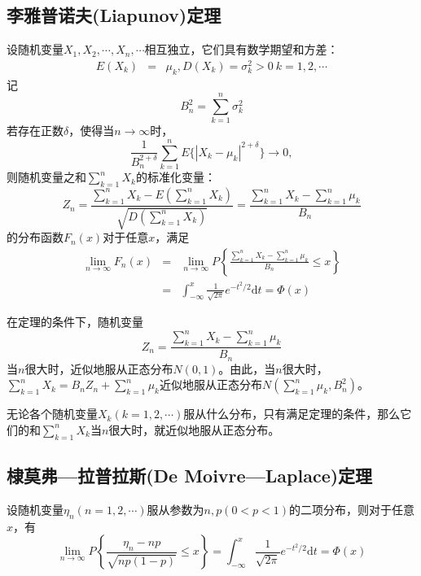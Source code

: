 \documentclass[12pt,a4paper]{article}
\newcommand{\dif}{\mathrm{d}}
\begin{document}
\subsection{李雅普诺夫(Liapunov)定理}
设随机变量$X_1, X_2, \cdots, X_n, \cdots$相互独立，它们具有数学期望和方差：
\begin{eqnarray}
\nonumber E(X_k) &=& \mu_k, D(X_k) = \sigma_k^2 > 0 ~k = 1, 2, \cdots
\end{eqnarray}
记
\begin{equation}
\nonumber B_n^2 = \sum_{k=1}^n \sigma_k^2 
\end{equation}
若存在正数$\delta$，使得当$n\rightarrow\infty$时，
\begin{equation}
\frac{1}{B_n^{2+\delta}} \sum_{k=1}^n E\{|X_k -\mu_k|^{2+\delta}  \} \rightarrow 0,
\end{equation}
则随机变量之和$\sum\limits_{k=1}^n X_k$的标准化变量：
\begin{equation}
Z_n = \frac{\sum\limits_{k=1}^n X_k -E\left(\sum\limits_{k=1}^n X_k \right)}{\sqrt{D\left(\sum\limits_{k=1}^n X_k \right)}} = \frac{\sum\limits_{k=1}^n X_k - \sum\limits_{k=1}^n \mu_k}{B_n}
\end{equation}
的分布函数$F_n(x)$对于任意$x$，满足
\begin{eqnarray}
\nonumber \lim_{n\rightarrow \infty} F_n(x) &=& \lim_{n\rightarrow \infty} P\left\{\frac{\sum\limits_{k=1}^n X_k - \sum\limits_{k=1}^n \mu_k}{B_n} \leqslant x \right\} \\
&=& \int_{-\infty}^x \frac{1}{\sqrt{2\pi}} e^{-t^2/2} \dif t = \Phi(x)
\end{eqnarray}

在定理的条件下，随机变量
\begin{equation}
Z_n = \frac{\sum\limits_{k=1}^n X_k - \sum\limits_{k=1}^n \mu_k}{B_n}
\end{equation}
当$n$很大时，近似地服从正态分布$N(0, 1)$。由此，当$n$很大时，$\sum\limits_{k=1}^n X_k = B_n Z_n +\sum\limits_{k=1}^n \mu_k$近似地服从正态分布$N\left(\sum\limits_{k=1}^n \mu_k, B_n^2 \right)$。


无论各个随机变量$X_k (k =1, 2, \cdots)$服从什么分布，只有满足定理的条件，那么它们的和$\sum\limits_{k=1}^n X_k$当$n$很大时，就近似地服从正态分布。


\subsection{棣莫弗—拉普拉斯(De Moivre—Laplace)定理}
设随机变量$\eta_n (n=1, 2, \cdots)$服从参数为$n, p (0 < p < 1)$的二项分布，则对于任意$x$，有
\begin{equation}
\lim_{n\rightarrow \infty} P\left\{\frac{\eta_n - n p}{\sqrt{np(1-p)}} \leqslant x \right\} =  \int_{-\infty}^x \frac{1}{\sqrt{2\pi}} e^{-t^2/2} \dif t = \Phi(x)
\end{equation}
\end{document}
